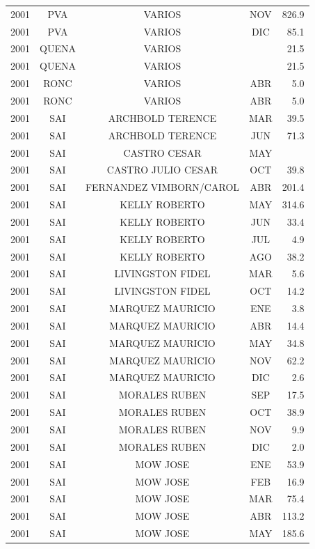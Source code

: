 \documentclass[12pt,]{article}
\begin{document}
\begin{table}[ht]
{\begin{tabular}{lcccr}
  2001 & PVA & VARIOS & NOV & 826.9 \\ 
  2001 & PVA & VARIOS & DIC & 85.1 \\ 
  2001 & QUENA & VARIOS &  & 21.5 \\ 
  2001 & QUENA & VARIOS &  & 21.5 \\ 
  2001 & RONC & VARIOS & ABR & 5.0 \\ 
  2001 & RONC & VARIOS & ABR & 5.0 \\ 
  2001 & SAI & ARCHBOLD TERENCE & MAR & 39.5 \\ 
  2001 & SAI & ARCHBOLD TERENCE & JUN & 71.3 \\ 
  2001 & SAI & CASTRO CESAR & MAY &  \\ 
  2001 & SAI & CASTRO JULIO CESAR & OCT & 39.8 \\ 
  2001 & SAI & FERNANDEZ VIMBORN/CAROL & ABR & 201.4 \\ 
  2001 & SAI & KELLY ROBERTO & MAY & 314.6 \\ 
  2001 & SAI & KELLY ROBERTO & JUN & 33.4 \\ 
  2001 & SAI & KELLY ROBERTO & JUL & 4.9 \\ 
  2001 & SAI & KELLY ROBERTO & AGO & 38.2 \\ 
  2001 & SAI & LIVINGSTON FIDEL & MAR & 5.6 \\ 
  2001 & SAI & LIVINGSTON FIDEL & OCT & 14.2 \\ 
  2001 & SAI & MARQUEZ MAURICIO & ENE & 3.8 \\ 
  2001 & SAI & MARQUEZ MAURICIO & ABR & 14.4 \\ 
  2001 & SAI & MARQUEZ MAURICIO & MAY & 34.8 \\ 
  2001 & SAI & MARQUEZ MAURICIO & NOV & 62.2 \\ 
  2001 & SAI & MARQUEZ MAURICIO & DIC & 2.6 \\ 
  2001 & SAI & MORALES RUBEN & SEP & 17.5 \\ 
  2001 & SAI & MORALES RUBEN & OCT & 38.9 \\ 
  2001 & SAI & MORALES RUBEN & NOV & 9.9 \\ 
  2001 & SAI & MORALES RUBEN & DIC & 2.0 \\ 
  2001 & SAI & MOW JOSE & ENE & 53.9 \\ 
  2001 & SAI & MOW JOSE & FEB & 16.9 \\ 
  2001 & SAI & MOW JOSE & MAR & 75.4 \\ 
  2001 & SAI & MOW JOSE & ABR & 113.2 \\ 
  2001 & SAI & MOW JOSE & MAY & 185.6 \\ 

\end{tabular}}
\end{table}
\end{document}
